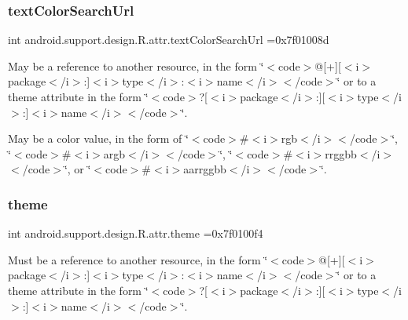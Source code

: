 \subsubsection{\texorpdfstring{text\+Color\+Search\+Url}{textColorSearchUrl}}
{\footnotesize\ttfamily int android.\+support.\+design.\+R.\+attr.\+text\+Color\+Search\+Url =0x7f01008d\hspace{0.3cm}{\ttfamily [static]}}

May be a reference to another resource, in the form \char`\"{}$<$code$>$@\mbox{[}+\mbox{]}\mbox{[}$<$i$>$package$<$/i$>$\+:\mbox{]}$<$i$>$type$<$/i$>$\+:$<$i$>$name$<$/i$>$$<$/code$>$\char`\"{} or to a theme attribute in the form \char`\"{}$<$code$>$?\mbox{[}$<$i$>$package$<$/i$>$\+:\mbox{]}\mbox{[}$<$i$>$type$<$/i$>$\+:\mbox{]}$<$i$>$name$<$/i$>$$<$/code$>$\char`\"{}. 

May be a color value, in the form of \char`\"{}$<$code$>$\#$<$i$>$rgb$<$/i$>$$<$/code$>$\char`\"{}, \char`\"{}$<$code$>$\#$<$i$>$argb$<$/i$>$$<$/code$>$\char`\"{}, \char`\"{}$<$code$>$\#$<$i$>$rrggbb$<$/i$>$$<$/code$>$\char`\"{}, or \char`\"{}$<$code$>$\#$<$i$>$aarrggbb$<$/i$>$$<$/code$>$\char`\"{}. \mbox{\label{classandroid_1_1support_1_1design_1_1R_1_1attr_a10605d4e34fb129fb634f376dda78853}} 
\subsubsection{\texorpdfstring{theme}{theme}}
{\footnotesize\ttfamily int android.\+support.\+design.\+R.\+attr.\+theme =0x7f0100f4\hspace{0.3cm}{\ttfamily [static]}}

Must be a reference to another resource, in the form \char`\"{}$<$code$>$@\mbox{[}+\mbox{]}\mbox{[}$<$i$>$package$<$/i$>$\+:\mbox{]}$<$i$>$type$<$/i$>$\+:$<$i$>$name$<$/i$>$$<$/code$>$\char`\"{} or to a theme attribute in the form \char`\"{}$<$code$>$?\mbox{[}$<$i$>$package$<$/i$>$\+:\mbox{]}\mbox{[}$<$i$>$type$<$/i$>$\+:\mbox{]}$<$i$>$name$<$/i$>$$<$/code$>$\char`\"{}. \mbox{\label{classandroid_1_1support_1_1design_1_1R_1_1attr_a7e47d9a993eb1d4446c21d067f23ea40}} 
